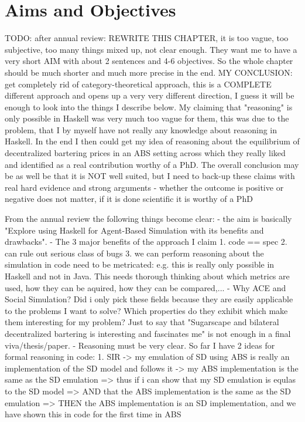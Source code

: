 \chapter{Aims and Objectives}
\label{chap:aimsObj}

TODO: after annual review: REWRITE THIS CHAPTER, it is too vague, too subjective, too many things mixed up, not clear enough. They want me to have a very short AIM with about 2 sentences and 4-6 objectives. So the whole chapter should be much shorter and much more precise in the end. MY CONCLUSION: get completely rid of category-theoretical approach, this is a COMPLETE different approach and opens up a very very different direction, I guess it will be enough to look into the things I describe below. My claiming that "reasoning" is only possible in Haskell was very much too vague for them, this was due to the problem, that I by myself have not really any knowledge about reasoning in Haskell. In the end I then could get my idea of reasoning about the equilibrium of decentralized bartering prices in an ABS setting across which they really liked and identified as a real contribution worthy of a PhD.
The overall conclusion may be as well be that it is NOT well suited, but I need to back-up these claims with real hard evidence and strong arguments - whether the outcome is positive or negative does not matter, if it is done scientific it is worthy of a PhD

From the annual review the following things become clear:
- the aim is basically "Explore using Haskell for Agent-Based Simulation with its benefits and drawbacks".
- The 3 major benefits of the approach I claim
	1. code == spec
	2. can rule out serious class of bugs
	3. we can perform reasoning about the simulation in code
	need to be metricated: e.g. this is really only possible in Haskell and not in Java. This needs thorough thinking about which metrics are used, how they can be aquired, how they can be compared,...
- Why ACE and Social Simulation? Did i only pick these fields because they are easily applicable to the problems I want to solve? Which properties do they exhibit which make them interesting for my problem? Just to say that "Sugarscape and bilateral decentralized bartering is interesting and fascinates me" is not enough in a final viva/thesis/paper.
- Reasoning must be very clear. So far I have 2 ideas for formal reasoning in code:
	1. SIR
		-> my emulation of SD using ABS is really an implementation of the SD model and follows it
		-> my ABS implementation is the same as the SD emulation
			=> thus if i can show that my SD emulation is equlas to the SD model
			=> AND that the ABS implementation is the same as the SD emulation
			=> THEN the ABS implementation is an SD implementation, and we have shown this in code for the first time in ABS

